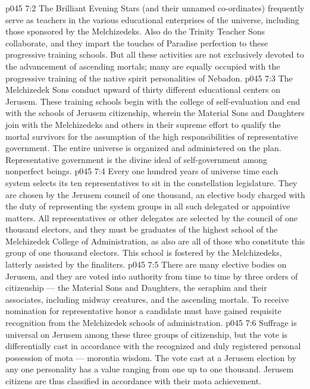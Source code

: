 \vs p045 7:2 The Brilliant Evening Stars (and their unnamed co\hyp{}ordinates) frequently serve as teachers in the various educational enterprises of the universe, including those sponsored by the Melchizedeks. Also do the Trinity Teacher Sons collaborate, and they impart the touches of Paradise perfection to these progressive training schools. But all these activities are not exclusively devoted to the advancement of ascending mortals; many are equally occupied with the progressive training of the native spirit personalities of Nebadon.
\vs p045 7:3 The Melchizedek Sons conduct upward of thirty different educational centers on Jerusem. These training schools begin with the college of self\hyp{}evaluation and end with the schools of Jerusem citizenship, wherein the Material Sons and Daughters join with the Melchizedeks and others in their supreme effort to qualify the mortal survivors for the assumption of the high responsibilities of representative government. The entire universe is organized and administered on the  plan. Representative government is the divine ideal of self\hyp{}government among nonperfect beings.
\vs p045 7:4 Every one hundred years of universe time each system selects its ten representatives to sit in the constellation legislature. They are chosen by the Jerusem council of one thousand, an elective body charged with the duty of representing the system groups in all such delegated or appointive matters. All representatives or other delegates are selected by the council of one thousand electors, and they must be graduates of the highest school of the Melchizedek College of Administration, as also are all of those who constitute this group of one thousand electors. This school is fostered by the Melchizedeks, latterly assisted by the finaliters.
\vs p045 7:5 \pc There are many elective bodies on Jerusem, and they are voted into authority from time to time by three orders of citizenship --- the Material Sons and Daughters, the seraphim and their associates, including midway creatures, and the ascending mortals. To receive nomination for representative honor a candidate must have gained requisite recognition from the Melchizedek schools of administration.
\vs p045 7:6 Suffrage is universal on Jerusem among these three groups of citizenship, but the vote is differentially cast in accordance with the recognized and duly registered personal possession of mota --- morontia wisdom. The vote cast at a Jerusem election by any one personality has a value ranging from one up to one thousand. Jerusem citizens are thus classified in accordance with their mota achievement.
